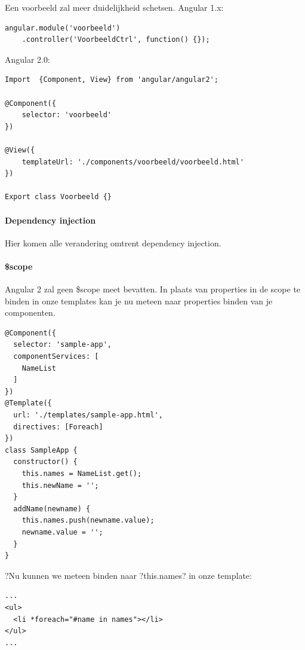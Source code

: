 \documentclass[pdftex,a4paper,12pt,twoside]{report}
\begin{document}
\newpage
\leavevmode
\newline
Een voorbeeld zal meer duidelijkheid schetsen.
\linebreak
\newline
Angular 1.x:

\begin{lstlisting}[frame=single]
angular.module('voorbeeld')
	.controller('VoorbeeldCtrl', function() {});
\end{lstlisting}

\leavevmode
\newline Angular 2.0:

\begin{lstlisting}[frame=single]
Import  {Component, View} from 'angular/angular2';

@Component({
    selector: 'voorbeeld'
})

@View({
    templateUrl: './components/voorbeeld/voorbeeld.html'
})

Export class Voorbeeld {}
\end{lstlisting}

\paragraph{Dependency injection} 
Hier komen alle verandering omtrent dependency injection.
\par

\paragraph{\$scope} 
Angular 2 zal geen \$scope meet bevatten. In plaats van properties in de scope te binden in onze templates kan je nu meteen naar properties binden van je componenten. 

\begin{lstlisting}[frame=single]
@Component({
  selector: 'sample-app',
  componentServices: [
    NameList
  ]
})
@Template({
  url: './templates/sample-app.html',
  directives: [Foreach]
})
class SampleApp {
  constructor() {
    this.names = NameList.get();
    this.newName = '';
  }
  addName(newname) {
    this.names.push(newname.value);
    newname.value = '';
  }
}
\end{lstlisting}
?Nu kunnen we meteen binden naar ?this.names? in onze template: 

\begin{lstlisting}[frame=single]
...
<ul>
  <li *foreach="#name in names"></li>
</ul>
...
\end{lstlisting}
\end{document}
